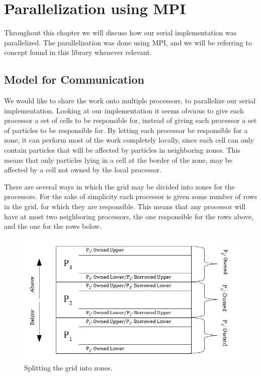 \chapter{Parallelization using MPI}

Throughout this chapter we will discuss how our serial implementation was parallelized. The parallelization was done
using MPI, and we will be referring to concept found in this library whenever relevant.

\section{Model for Communication}

We would like to share the work onto multiple processors, to parallelize our serial implementation. Looking at our
implementation it seems obvious to give each processor a set of cells to be responsible for, instead of giving each
processor a set of particles to be responsible for. By letting each processor be responsible for a zone, it can
perform most of the work completely locally, since each cell can only contain particles that will be affected by
particles in neighboring zones. This means that only particles lying in a cell at the border of the zone, may be
affected by a cell not owned by the local processor.

There are several ways in which the grid may be divided into zones for the processors. For the sake of simplicity
each processor is given some number of rows in the grid, for which they are responsible. This means that any processor
will have at most two neighboring processors, the one responsible for the rows above, and the one for the rows below.

\begin{figure}[H]
  \centering
  \begin{minipage}[b]{0.9\textwidth}
    \includegraphics[width=\textwidth]{zones.png}
    \caption{Splitting the grid into zones.}
  \end{minipage}
  \label{fig:zones}
\end{figure}

